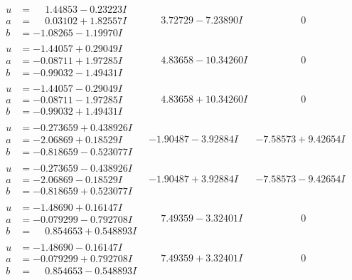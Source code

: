 \documentclass[1p]{elsarticle_modified}
\theoremstyle{definition}
\begin{document}
$$\begin{array}{c|c|c}
\begin{aligned}
u &= \phantom{-}1.44853 - 0.23223 I \\
a &= \phantom{-}0.03102 + 1.82557 I \\
b &= -1.08265 - 1.19970 I\end{aligned}
 & \phantom{-}3.72729 - 7.23890 I & \phantom{-0.000000 } 0 \\ \hline\begin{aligned}
u &= -1.44057 + 0.29049 I \\
a &= -0.08711 + 1.97285 I \\
b &= -0.99032 - 1.49431 I\end{aligned}
 & \phantom{-}4.83658 - 10.34260 I & \phantom{-0.000000 } 0 \\ \hline\begin{aligned}
u &= -1.44057 - 0.29049 I \\
a &= -0.08711 - 1.97285 I \\
b &= -0.99032 + 1.49431 I\end{aligned}
 & \phantom{-}4.83658 + 10.34260 I & \phantom{-0.000000 } 0 \\ \hline\begin{aligned}
u &= -0.273659 + 0.438926 I \\
a &= -2.06869 + 0.18529 I \\
b &= -0.818659 - 0.523077 I\end{aligned}
 & -1.90487 - 3.92884 I & -7.58573 + 9.42654 I \\ \hline\begin{aligned}
u &= -0.273659 - 0.438926 I \\
a &= -2.06869 - 0.18529 I \\
b &= -0.818659 + 0.523077 I\end{aligned}
 & -1.90487 + 3.92884 I & -7.58573 - 9.42654 I \\ \hline\begin{aligned}
u &= -1.48690 + 0.16147 I \\
a &= -0.079299 - 0.792708 I \\
b &= \phantom{-}0.854653 + 0.548893 I\end{aligned}
 & \phantom{-}7.49359 - 3.32401 I & \phantom{-0.000000 } 0 \\ \hline\begin{aligned}
u &= -1.48690 - 0.16147 I \\
a &= -0.079299 + 0.792708 I \\
b &= \phantom{-}0.854653 - 0.548893 I\end{aligned}
 & \phantom{-}7.49359 + 3.32401 I & \phantom{-0.000000 } 0\\

\end{array}$$
\end{document}
